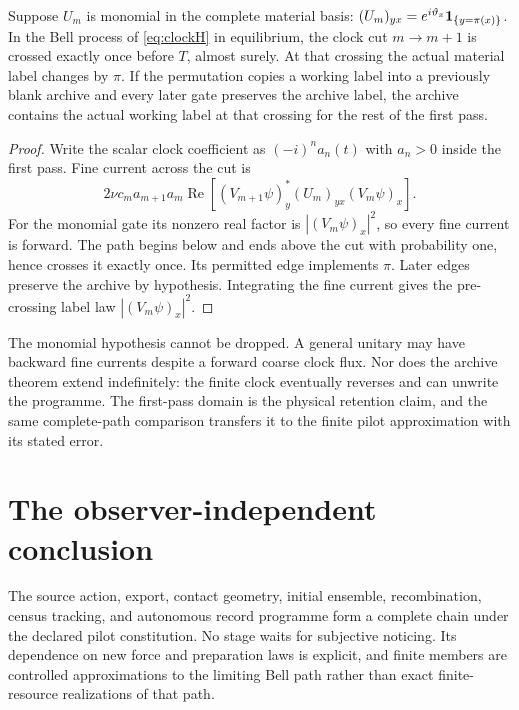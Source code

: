 \begin{theorem}\label{thm:archivecut}
Suppose $U_m$ is monomial in the complete material basis: $(U_m)_{yx}=e^{i\vartheta_x}\mathbf 1_{\{y=\pi(x)\}}$. In the Bell process of \cref{eq:clockH} in equilibrium, the clock cut $m\to m+1$ is crossed exactly once before $T$, almost surely. At that crossing the actual material label changes by $\pi$. If the permutation copies a working label into a previously blank archive and every later gate preserves the archive label, the archive contains the actual working label at that crossing for the rest of the first pass.
\end{theorem}
\begin{proof}
Write the scalar clock coefficient as $(-i)^na_n(t)$ with $a_n>0$ inside the first pass. Fine current across the cut is
\[
2\nu c_ma_{m+1}a_m\operatorname{Re}
\left[(V_{m+1}\psi)_y^*(U_m)_{yx}(V_m\psi)_x\right].
\]
For the monomial gate its nonzero real factor is $|(V_m\psi)_x|^2$, so every fine current is forward. The path begins below and ends above the cut with probability one, hence crosses it exactly once. Its permitted edge implements $\pi$. Later edges preserve the archive by hypothesis. Integrating the fine current gives the pre-crossing label law $|(V_m\psi)_x|^2$.
\end{proof}

The monomial hypothesis cannot be dropped. A general unitary may have backward fine currents despite a forward coarse clock flux. Nor does the archive theorem extend indefinitely: the finite clock eventually reverses and can unwrite the programme. The first-pass domain is the physical retention claim, and the same complete-path comparison transfers it to the finite pilot approximation with its stated error.

\section{The observer-independent conclusion}\label{section:pilot:the-observer-independent-conclusion}
The source action, export, contact geometry, initial ensemble, recombination, census tracking, and autonomous record programme form a complete chain under the declared pilot constitution. No stage waits for subjective noticing. Its dependence on new force and preparation laws is explicit, and finite members are controlled approximations to the limiting Bell path rather than exact finite-resource realizations of that path.

